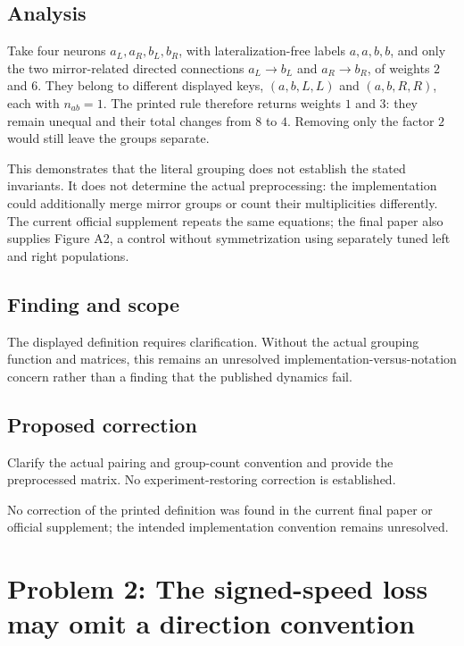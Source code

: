 \documentclass[11pt]{article}
\begin{document}
\subsection*{Analysis}

Take four neurons \(a_L,a_R,b_L,b_R\), with lateralization-free labels \(a,a,b,b\), and only the two mirror-related directed connections \(a_L\to b_L\) and \(a_R\to b_R\), of weights \(2\) and \(6\). They belong to different displayed keys, \((a,b,L,L)\) and \((a,b,R,R)\), each with \(n_{ab}=1\). The printed rule therefore returns weights \(1\) and \(3\): they remain unequal and their total changes from \(8\) to \(4\). Removing only the factor \(2\) would still leave the groups separate.

This demonstrates that the literal grouping does not establish the stated invariants. It does not determine the actual preprocessing: the implementation could additionally merge mirror groups or count their multiplicities differently. The current official supplement repeats the same equations; the final paper also supplies Figure A2, a control without symmetrization using separately tuned left and right populations.

\subsection*{Finding and scope}

The displayed definition requires clarification. Without the actual grouping function and matrices, this remains an unresolved implementation-versus-notation concern rather than a finding that the published dynamics fail.

\subsection*{Proposed correction}

Clarify the actual pairing and group-count convention and provide the preprocessed matrix. No experiment-restoring correction is established.

No correction of the printed definition was found in the current final paper or official supplement; the intended implementation convention remains unresolved.

\section*{Problem 2: The signed-speed loss may omit a direction convention}
\end{document}
